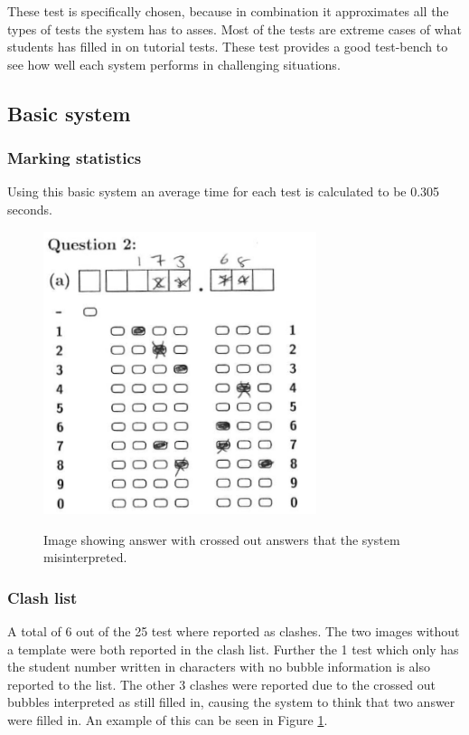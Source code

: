 These test is specifically chosen, because in combination it approximates all the types of tests the system has to asses. Most of the tests are extreme cases of what students has filled in on tutorial tests. These test provides a good test-bench to see how well each system performs in challenging situations.

\subsection{Basic system}
\subsubsection{Marking statistics}

Using this basic system an average time for each test is calculated to be 0.305 seconds. 

\begin{figure}
  \centering
  \includegraphics[width=8cm]{crossClash}\\
  \caption{Image showing answer with crossed out answers that the system misinterpreted.}
  \label{fig:crossClash}
\end{figure}

\subsubsection{Clash list}

A total of 6 out of the 25 test where reported as clashes. The two images without a template were both reported in the clash list. Further the 1 test which only has the student number written in characters with no bubble information is also reported to the list. The other 3 clashes were reported due to the crossed out bubbles interpreted as still filled in, causing the system to think that two answer were filled in. An example of this can be seen in Figure \ref{fig:crossClash}.

